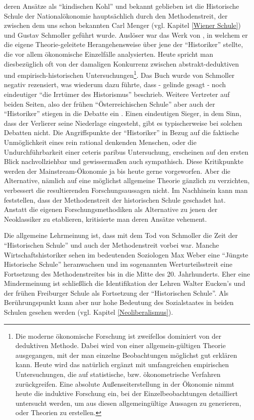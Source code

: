 deren Ansätze als "`kindischen Kohl"' und bekannt geblieben ist die Historische Schule der Nationalökonomie hauptsächlich durch den Methodenstreit, der zwischen dem uns schon bekannten Carl Menger (vgl. Kapitel \ref{Wiener Schule}) und Gustav Schmoller geführt wurde. Auslöser war das Werk von \textcite{Menger1883}, in welchem er die eigene Theorie-geleitete Herangehensweise über jene der "`Historiker"' stellte, die vor allem ökonomische Einzelfälle analysierten. Heute spricht man diesbezüglich oft von der damaligen Konkurrenz zwischen abstrakt-deduktiven und empirisch-historischen Untersuchungen\footnote{Die moderne ökonomische Forschung ist zweifellos dominiert von der deduktiven Methode. Dabei wird von einer allgemein-gültigen Theorie ausgegangen, mit der man einzelne Beobachtungen möglichst gut erklären kann. Heute wird das natürlich ergänzt mit umfangreichen empirischen Untersuchungen, die auf statistische, bzw. ökonometrische Verfahren zurückgreifen. Eine absolute Außenseiterstellung in der Ökonomie nimmt heute die induktive Forschung ein, bei der Einzelbeobachtungen detailliert untersucht werden, um aus diesen allgemeingültige Aussagen zu generieren, oder Theorien zu erstellen.}. Das Buch wurde von Schmoller negativ rezensiert, was wiederum dazu führte, dass \textcite{Schmoller1904} - gelinde gesagt - noch eindeutiger "`die Irrtümer des Historismus"' beschrieb. Weitere Vertreter auf beiden Seiten, also der frühen "`Österreichischen Schule"' aber auch der "`Historiker"' stiegen in die Debatte ein \parencite[S. 782]{Schumpeter1954}. Einen eindeutigen Sieger, in dem Sinn, dass der Verlierer seine Niederlage eingesteht, gibt es typischerweise bei solchen Debatten nicht. Die Angriffspunkte der "`Historiker"' in Bezug auf die faktische Unmöglichkeit eines rein rational denkenden Menschen, oder die Undurchführbarkeit einer ceteris paribus Untersuchung, erscheinen auf den ersten Blick nachvollziehbar und gewissermaßen auch sympathisch. Diese Kritikpunkte werden der Mainstream-Ökonomie ja bis heute gerne vorgeworfen. Aber die Alternative, nämlich auf eine möglichst allgemeine Theorie gänzlich zu verzichten, verbessert die resultierenden Forschungsaussagen nicht. Im Nachhinein kann man feststellen, dass der Methodenstreit der historischen Schule geschadet hat. Anstatt die eigenen Forschungsmethodiken als Alternative zu jenen der Neoklassiker zu etablieren, kritisierte man deren Ansätze vehement. 

Die allgemeine Lehrmeinung ist, dass mit dem Tod von Schmoller die Zeit der "`Historischen Schule"' und auch der Methodenstreit vorbei war. Manche Wirtschaftshistoriker sehen im bedeutenden Soziologen Max Weber eine "`Jüngste Historische Schule"' heranwachsen und im sogenannten Werturteilsstreit eine Fortsetzung des Methodenstreites bis in die Mitte des 20. Jahrhunderts. Eher eine Mindermeinung ist schließlich die Identifikation der Lehren Walter Eucken's und der frühen Freiburger Schule als Fortsetzung der "`Historischen Schule"'. Als Berührungspunkt kann aber nur hohe Bedeutung des Sozialstaates in beiden Schulen gesehen werden (vgl. Kapitel \ref{Neoliberalismus}). 

